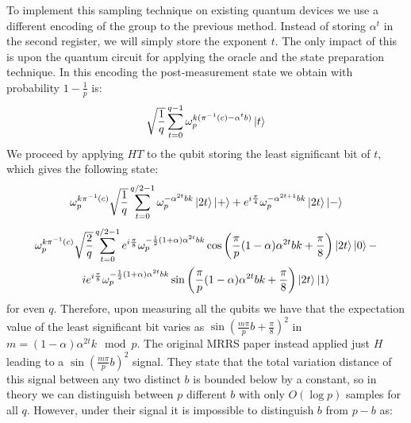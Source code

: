 To implement this sampling technique on existing quantum devices we use a different encoding of the group to the previous method. Instead of storing $\alpha^t$ in the second register, we will simply store the exponent $t$. The only impact of this is upon the quantum circuit for applying the oracle and the state preparation technique. In this encoding the post-measurement state we obtain with probability $1-\frac{1}{p}$ is:
\begin{equation}
    \sqrt{\frac{1}{q}}\sum_{t=0}^{q-1} \omega_p^{k (\pi^{-1}(c) - \alpha^tb)}\ket{t}
\end{equation}
We proceed by applying $HT$ to the qubit storing the least significant bit of $t$, which gives the following state:
\begin{equation}
    \omega_p^{k \pi^{-1}(c)}\sqrt{\frac{1}{q}}\sum_{t=0}^{q/2-1} \omega_p^{- \alpha^{2t}bk}\ket{2t}\ket{+}+ e^{i\frac{\pi}{4}}\omega_p^{ - \alpha^{2t+1}bk}\ket{2t}\ket{-}
\end{equation}
\begin{multline}
    \omega_p^{k \pi^{-1}(c)}\sqrt{\frac{2}{q}}\sum_{t=0}^{q/2-1} e^{i\frac{\pi}{8}}\omega_p^{ -\frac{1}{2}(1+\alpha)\alpha^{2t}bk}\cos\left(\frac{\pi}{p}(1-\alpha)\alpha^{2t}bk+ \frac{\pi}{8}\right) \ket{2t}\ket{0}-\\
    ie^{i\frac{\pi}{8}}\omega_p^{ -\frac{1}{2}(1+\alpha)\alpha^{2t}bk}\sin \left( \frac{\pi}{p}(1-\alpha)\alpha^{2t}bk + \frac{\pi}{8}\right)\ket{2t}\ket{1}
\end{multline}
for even $q$. Therefore, upon measuring all the qubits we have that the expectation value of the least significant bit varies as $\sin \left( \frac{m\pi}{p}b + \frac{\pi}{8}\right)^2$ in $m=(1-\alpha)\alpha^{2t}k \mod p$. The original MRRS paper instead applied just $H$ leading to a $\sin \left( \frac{m\pi}{p}b\right)^2$ signal. They state that the total variation distance of this signal between any two distinct $b$ is bounded below by a constant, so in theory we can distinguish between $p$ different $b$ with only $O(\log p)$ samples for all $q$. However, under their signal it is impossible to distinguish $b$ from $p-b$ as:

